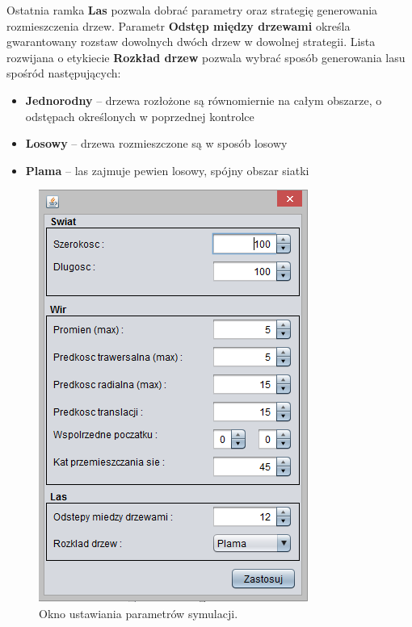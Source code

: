 Ostatnia ramka \textbf{Las} pozwala dobrać parametry oraz strategię generowania rozmieszczenia drzew. Parametr \textbf{Odstęp między drzewami} określa gwarantowany rozstaw dowolnych dwóch drzew w dowolnej strategii. Lista rozwijana o etykiecie \textbf{Rozkład drzew} pozwala wybrać sposób generowania lasu spośród następujących:
\begin{itemize}
\item \textbf{Jednorodny} -- drzewa rozłożone są równomiernie na całym obszarze, o odstępach określonych w poprzednej kontrolce
\item \textbf{Losowy} -- drzewa rozmieszczone są w sposób losowy
\item \textbf{Plama} -- las zajmuje pewien losowy, spójny obszar siatki
\end{itemize}

\begin{figure}[!h]
	\center
	\includegraphics[scale=1]{gui_param}
	\caption{Okno ustawiania parametrów symulacji.}
	\label{fig:gui_param}
\end{figure} 